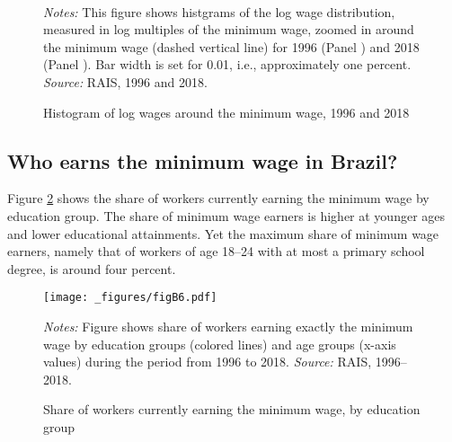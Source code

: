 \begin{figure}[!htb]
  \centering
  \caption{\label{fig:histogram_around_mw_log}Histogram of log wages around the minimum wage, 1996 and 2018}
  \prefigvspace
  \\
  \postfigvspace
  \begin{minipage}[t]{1\columnwidth}%
    \begin{spacing}{0.75}
      \emph{\scriptsize{}Notes: }{\scriptsize{}This figure shows histgrams of the log wage distribution, measured in log multiples of the minimum wage, zoomed in around the minimum wage (dashed vertical line) for 1996 (Panel ) and 2018 (Panel ). Bar width is set for 0.01, i.e., approximately one percent. %
      \emph{\scriptsize{}Source: } RAIS, 1996 and 2018.}
    \end{spacing}
  \end{minipage}
\end{figure}




\clearpage
\subsection{Who earns the minimum wage in Brazil?\label{appendix:who_earns_the_mw}}

Figure \ref{fig: MW_share_current_by_edu} shows the share of workers currently earning the minimum wage by education group. The share of minimum wage earners is higher at younger ages and lower educational attainments. Yet the maximum share of minimum wage earners, namely that of workers of age 18--24 with at most a primary school degree, is around four percent.


\begin{figure}[!htb]
  \centering
  \caption{\label{fig: MW_share_current_by_edu}Share of workers currently earning the minimum wage, by education group}
  \prefigvspace
  \texttt{[image: \_figures/figB6.pdf]} %
  \\
  \postfigvspace
  \begin{minipage}[t]{1\columnwidth}%
    \begin{spacing}{0.75}
      \emph{\scriptsize{}Notes: }{\scriptsize{}Figure shows share of workers earning exactly the minimum wage by education groups (colored lines) and age groups (x-axis values) during the period from 1996 to 2018. %
      \emph{\scriptsize{}Source: } RAIS, 1996--2018.}
    \end{spacing}
  \end{minipage}
\end{figure}


